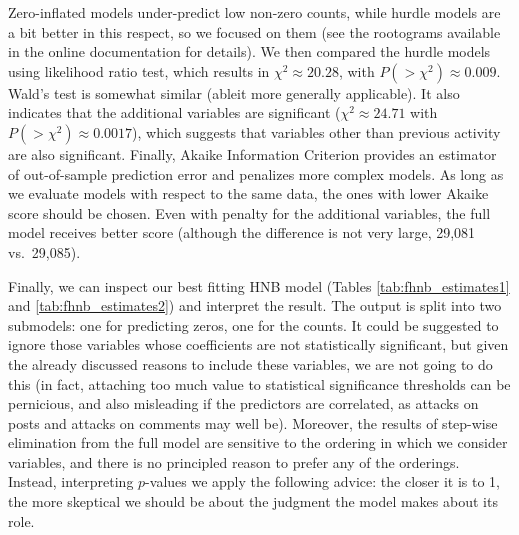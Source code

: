 \documentclass[a4paper,fleqn]{cas-dc}
\begin{document}
Zero-inflated models under-predict low non-zero counts, while hurdle
models are a bit better in this respect, so we focused on them (see the
rootograms available in the online documentation for details). We then
compared the hurdle models using likelihood ratio test, which results in
\(\chi^2 \approx 20.28\), with \(P(>\chi^2)\approx 0.009\). Wald's test
is somewhat similar (ableit more generally applicable). It also
indicates that the additional variables are significant
(\(\chi^2 \approx 24.71\) with \(P(>\chi^2)\approx 0.0017\)), which
suggests that variables other than previous activity are also
significant. Finally, Akaike Information Criterion \citep{Akaike1974model}
provides an estimator of out-of-sample prediction error and penalizes
more complex models. As long as we evaluate models with respect to the
same data, the ones with lower Akaike score should be chosen. Even with
penalty for the additional variables, the full model receives better
score (although the difference is not very large, 29,081 vs.~29,085).

Finally, we can inspect our best fitting HNB model (Tables
\ref{tab:fhnb_estimates1} and \ref{tab:fhnb_estimates2}) and interpret
the result. The output is split into two submodels: one for predicting
zeros, one for the counts. It could be suggested to ignore those
variables whose coefficients are not statistically significant, but
given the already discussed reasons to include these variables, we are
not going to do this (in fact, attaching too much value to statistical
significance thresholds can be pernicious, and also misleading if the
predictors are correlated, as attacks on posts and attacks on comments
may well be). Moreover, the results of step-wise elimination from the
full model are sensitive to the ordering in which we consider variables,
and there is no principled reason to prefer any of the orderings.
Instead, interpreting \(p\)-values we apply the following advice: the
closer it is to 1, the more skeptical we should be about the judgment
the model makes about its role.
\end{document}
